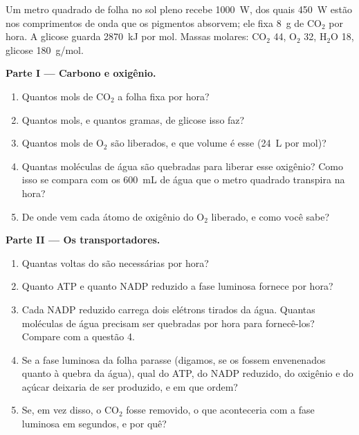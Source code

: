 \begin{problem}
\label{pb:g12:photosynthesis:1}
Um metro quadrado de folha no sol pleno recebe \qty{1000}{W}, dos quais
\qty{450}{W} estão nos comprimentos de onda que os pigmentos absorvem;
ele fixa \qty{8}{g} de $\mathrm{CO_2}$ por hora. A glicose guarda
\qty{2870}{kJ} por mol. Massas molares: $\mathrm{CO_2}$ 44,
$\mathrm{O_2}$ 32, $\mathrm{H_2O}$ 18, glicose \qty{180}{g/mol}.

\medskip
\noindent\textbf{Parte I --- Carbono e oxigênio.}
\begin{enumerate}
  \item Quantos mols de $\mathrm{CO_2}$ a folha fixa por hora?
  \item Quantos mols, e quantos gramas, de glicose isso faz?
  \item Quantos mols de $\mathrm{O_2}$ são liberados, e que volume é
        esse (\qty{24}{L} por mol)?
  \item Quantas moléculas de água são quebradas para liberar esse
        oxigênio? Como isso se compara com os \qty{600}{mL} de água que
        o metro quadrado transpira na hora?
  \item De onde vem cada átomo de oxigênio do $\mathrm{O_2}$ liberado,
        e como você sabe?
\end{enumerate}

\medskip
\noindent\textbf{Parte II --- Os transportadores.}
\begin{enumerate}[resume]
  \item Quantas voltas do  são necessárias por hora?
  \item Quanto ATP e quanto NADP reduzido a fase luminosa fornece por hora?
  \item Cada NADP reduzido carrega dois elétrons tirados da água.
        Quantas moléculas de água precisam ser quebradas por hora para
        fornecê-los? Compare com a questão 4.
  \item Se a fase luminosa da folha parasse (digamos, se os
         fossem envenenados quanto à quebra da água), qual
        do ATP, do NADP reduzido, do oxigênio e do açúcar deixaria de
        ser produzido, e em que ordem?
  \item Se, em vez disso, o $\mathrm{CO_2}$ fosse removido, o que
        aconteceria com a fase luminosa em segundos, e por quê?
\end{enumerate}


\end{problem}
